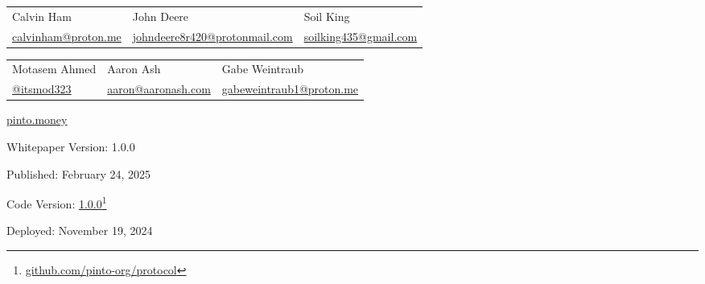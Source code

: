 \documentclass[tikz]{article}
\begin{document}
\begin{titlepage}
\begin{center}
        \vspace*{-0.52cm}

        \begin{center}
            \begin{tabular}{>{\centering\arraybackslash}p{4.6cm} >{\centering\arraybackslash}p{4.6cm} >{\centering\arraybackslash}p{4.6cm}}
                Calvin Ham & John Deere & Soil King \\
                 \href{mailto:calvinham@proton.me}{\normalsize{calvinham@proton.me}} & \href{mailto:johndeere8r420@protonmail.com}{\normalsize{johndeere8r420@protonmail.com}} & \href{mailto:soilking435@gmail.com}{\normalsize{soilking435@gmail.com}}
            \end{tabular}
        \end{center}

        \vspace*{-0.52cm}

        \begin{center}
            \begin{tabular}{>{\centering\arraybackslash}p{4.6cm} >{\centering\arraybackslash}p{4.6cm} >{\centering\arraybackslash}p{4.6cm}}
                Motasem Ahmed & Aaron Ash & Gabe Weintraub \\
                \href{https://x.com/itsmod323}{\normalsize{@itsmod323}} & \href{mailto:aaron@aaronash.com}{\normalsize{aaron@aaronash.com}} & \href{mailto:gabeweintraub1@proton.me}{\normalsize{gabeweintraub1@proton.me}}
            \end{tabular}
        \end{center}


        \normalsize{\href{https://pinto.money/}{pinto.money}}

        \footnotesize{Whitepaper Version:} {\normalsize{1.0.0}}

        \vspace{-0.25cm}
        \footnotesize{Published:} {\normalsize{February 24, 2025}}

        \vspace{-0.25cm}
        \footnotesize{Code Version:} \href{https://github.com/pinto-org/protocol}{\normalsize{1.0.0}}\footnote{\href{https://github.com/pinto-org/protocol}{github.com/pinto-org/protocol}}

        \vspace{-0.25cm}
        \footnotesize{Deployed:} {\normalsize{November 19, 2024}}
        

\end{center}
\end{titlepage}
\end{document}
